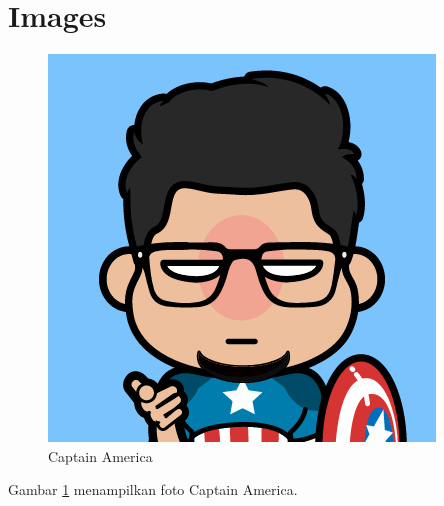 \documentclass{article}
\begin{document}
    \newpage
    \section{Images}

    \begin{figure}[h!]
        \centering
        \includegraphics[width=0.5\linewidth]{A.png}
        \caption{Captain America}
        \label{fig:capt}
    \end{figure}

    Gambar \ref{fig:capt} menampilkan foto Captain America.
\end{document}
